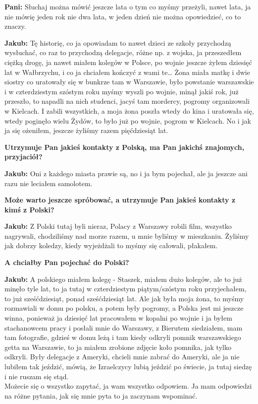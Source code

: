 \textbf{Pani:} Słuchaj można mówić jeszcze lata o tym co myśmy przeżyli, nawet lata, ja nie mówię jeden rok nie dwa lata, w jeden dzień nie można opowiedzieć, co to znaczy. 

\textbf{Jakub:} Tę historię, co ja opowiadam to nawet dzieci ze szkoły przychodzą wysłuchać, co raz to przychodzą delegacje, różne np. z wojska, ja przeszedłem ciężką drogę, ja nawet miałem kolegów w Polsce, po wojnie jeszcze żyłem dziesięć lat w Wałbrzychu, i co ja chciałem kończyć z wami te… Żona miała matkę i dwie siostry co uratowały się w bunkrze tam w Warszawie, było powstanie warszawskie i w czterdziestym szóstym roku myśmy wyszli po wojnie, minął jakiś rok, już przeszło, to napadli na nich studenci, jacyś tam mordercy, pogromy organizowali w Kielcach. I zabili wszystkich,    a moja żona poszła wtedy do kina i uratowała się, wtedy poginęło wielu Żydów, to było już po wojnie, pogrom w Kielcach. No i jak ja się ożeniłem, jeszcze żyliśmy razem pięćdziesiąt lat.  

\textbf{Utrzymuje Pan jakieś kontakty z Polską, ma Pan jakichś znajomych, przyjaciół?} 

\textbf{Jakub:} Oni z każdego miasta prawie są, no i ja bym pojechał, ale ja jeszcze ani razu nie leciałem samolotem. 

\textbf{Może warto jeszcze spróbować, a utrzymuje Pan jakieś kontakty z kimś z Polski?} 

\textbf{Jakub:} Z Polski tutaj byli nieraz, Polacy z Warszawy robili film, wszystko nagrywali, chodziliśmy nad morze razem, u mnie byliśmy w mieszkaniu. Żyliśmy jak dobrzy koledzy, kiedy wyjeżdżali to myśmy się całowali, płakałem. 

\textbf{A chciałby Pan pojechać do Polski?} 

\textbf{Jakub:} A polskiego miałem kolegę - Staszek, miałem dużo kolegów, ale to już minęło tyle lat, to ja tutaj w czterdziestym piątym/szóstym roku przyjechałem, to już sześćdziesiąt, ponad sześćdziesiąt lat. Ale jak była moja żona, to myśmy rozmawiali w domu po polsku, a potem były pogromy, a Polska jest mi jeszcze winna, ponieważ ja dziesięć lat pracowałem w kopalni po wojnie i ja byłem stachanowcem pracy i posłali mnie do Warszawy, z Bierutem siedziałem, mam tam fotografie, gdzieś w domu leżą i tam kiedy odkryli pomnik warszawskiego getta na Warszawie, to ja miałem zrobione zdjęcie koło pomnika, jak tylko odkryli. Były delegacje z Ameryki, chcieli mnie zabrać do Ameryki, ale ja nie lubiłem tak jeździć, mówią, że Izraelczycy lubią jeździć po świecie, ja tutaj siedzę i nie ruszam się stąd.\\
Możecie się o wszystko zapytać, ja wam wszystko odpowiem. Ja mam odpowiedzi na różne pytania, jak się mnie pyta to ja zaczynam wspominać. 

